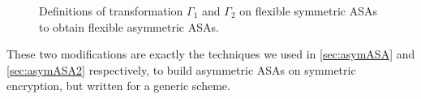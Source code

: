 \begin{figure}
\centering
\begin{pchstack}
\pchspace
{}
\end{pchstack}
\caption[Definitions of transformation $\Gamma_1$ and $\Gamma_2$ on flexible symmetric ASAs to obtain flexible asymmetric ASAs]{Definitions of transformation $\Gamma_1$ and $\Gamma_2$ on flexible symmetric ASAs to obtain flexible asymmetric ASAs.}
\label{figure:gammas}
\end{figure}

These two modifications are exactly the techniques we used in \autoref{sec:asymASA} and \autoref{sec:asymASA2} respectively, to build asymmetric ASAs on symmetric encryption, but written for a generic scheme.

